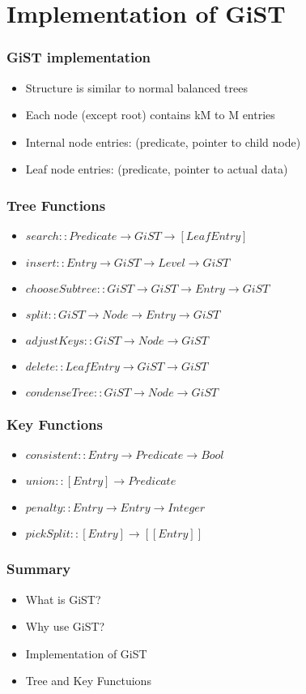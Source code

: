 \documentclass{beamer}
\begin{document}
\section {Implementation of GiST}
\begin{frame}%
  \frametitle{GiST implementation} %
  \begin {itemize}
  \item Structure is similar to normal balanced trees
  \pause \item Each node (except root) contains kM to M entries
  \pause \item Internal node entries: (predicate, pointer to child node)
  \pause \item Leaf node entries: (predicate, pointer to actual data)
  \end {itemize}
\end{frame}
\begin{frame}%
  \frametitle{Tree Functions} %
  \begin {itemize}
  \item $search :: Predicate \rightarrow GiST \rightarrow [LeafEntry]$
  \pause \item $insert :: Entry \rightarrow GiST \rightarrow Level \rightarrow GiST$
  \pause \item $chooseSubtree :: GiST \rightarrow GiST \rightarrow Entry \rightarrow GiST $
  \pause \item $split ::  GiST \rightarrow Node \rightarrow Entry \rightarrow GiST$
  \pause \item $adjustKeys :: GiST \rightarrow Node \rightarrow GiST$
  \pause \item $delete :: LeafEntry \rightarrow GiST \rightarrow GiST$
  \pause \item $condenseTree ::  GiST \rightarrow Node \rightarrow GiST$
  \end {itemize}
\end{frame}
\begin{frame}%
  \frametitle{Key Functions} %
  \begin {itemize}
  \item $consistent :: Entry \rightarrow Predicate \rightarrow Bool$
  \pause \item $union ::  [Entry] \rightarrow Predicate$
  \pause \item $penalty :: Entry \rightarrow Entry \rightarrow Integer$
  \pause \item $pickSplit ::  [Entry] \rightarrow [[Entry]]$
  \end {itemize}
\end{frame}
\begin{frame}
  \frametitle{Summary}
  \begin {itemize}
  \item What is GiST?
  \item Why use GiST?
  \item Implementation of GiST
  \item Tree and Key Functuions
  \end {itemize}
\end{frame}
\end{document}
